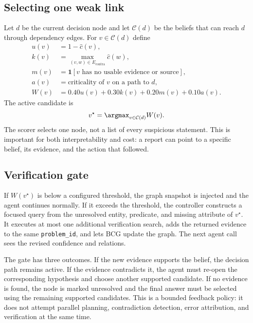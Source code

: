 \documentclass{article}
\begin{document}
\subsection{Selecting one weak link}

Let $d$ be the current decision node and let $\mathcal C(d)$ be the beliefs
that can reach $d$ through dependency edges. For $v\in\mathcal C(d)$ define
\begin{equation}\label{eq:weak}
\begin{aligned}
u(v) &= 1-\hat{c}(v),\\
k(v) &= \max_{(v,w)\in E_{\mathrm{contra}}}\hat{c}(w),\\
m(v) &= \mathbf{1}[\text{$v$ has no usable evidence or source}],\\
a(v) &= \text{criticality of $v$ on a path to $d$},\\
W(v) &= 0.40u(v)+0.30k(v)+0.20m(v)+0.10a(v).
\end{aligned}
\end{equation}
The active candidate is
\begin{equation}\label{eq:argmin}
v^\star=\argmax_{v\in\mathcal C(d)}W(v).
\end{equation}
The scorer selects one node, not a list of every suspicious statement. This
is important for both interpretability and cost: a report can point to a
specific belief, its evidence, and the action that followed.

\subsection{Verification gate}

If $W(v^\star)$ is below a configured threshold, the graph snapshot is injected
and the agent continues normally. If it exceeds the threshold, the controller
constructs a focused query from the unresolved entity, predicate, and missing
attribute of $v^\star$. It executes at most one additional verification search,
adds the returned evidence to the same \texttt{problem\_id}, and lets BCG update
the graph. The next agent call sees the revised confidence and relations.

The gate has three outcomes. If the new evidence supports the belief, the
decision path remains active. If the evidence contradicts it, the agent must
re-open the corresponding hypothesis and choose another supported candidate.
If no evidence is found, the node is marked unresolved and the final answer
must be selected using the remaining supported candidates. This is a bounded
feedback policy: it does not attempt parallel planning, contradiction
detection, error attribution, and verification at the same time.
\end{document}
